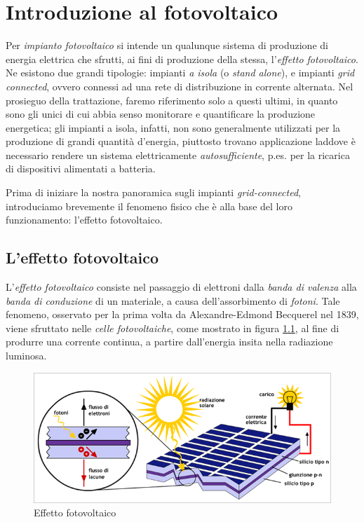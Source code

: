\clearpage{\pagestyle{empty}\cleardoublepage}
\chapter{Introduzione al fotovoltaico}
%
Per \emph{impianto fotovoltaico} si intende un qualunque 
sistema di produzione di energia elettrica che sfrutti, ai fini 
di produzione della stessa, l'\emph{effetto fotovoltaico}.
%
Ne esistono due grandi tipologie: impianti \emph{a isola} (o \emph{stand alone}), 
e impianti \emph{grid connected}, ovvero connessi ad una rete di distribuzione in 
corrente alternata.
%
Nel prosieguo della trattazione, faremo riferimento solo a questi ultimi, 
in quanto sono gli unici di cui abbia senso monitorare e quantificare la produzione energetica; gli impianti 
a isola, infatti, non sono generalmente utilizzati per la produzione di grandi
quantit\`a d'energia, piuttosto trovano applicazione laddove \`e necessario
rendere un sistema elettricamente \emph{autosufficiente}, p.es. per la 
ricarica di dispositivi alimentati a batteria.
%

%
Prima di iniziare la nostra panoramica sugli impianti \emph{grid-connected}, introduciamo
brevemente il fenomeno fisico che \`e alla base del loro funzionamento:
l'effetto fotovoltaico.
%

%
\section{L'effetto fotovoltaico}
L'\emph{effetto fotovoltaico} consiste nel passaggio di elettroni 
dalla \emph{banda di valenza} alla \emph{banda di conduzione} di 
un materiale, a causa dell'assorbimento di \emph{fotoni}. 
%
Tale fenomeno, osservato per la prima volta da Alexandre-Edmond Becquerel nel 1839,
viene sfruttato nelle \emph{celle fotovoltaiche}, come mostrato in figura \ref{effetto-fv},
al fine di produrre una corrente continua, a partire dall'energia insita 
nella radiazione luminosa.
%
\begin{figure}[!h]
\centering
\includegraphics[width=350pt]{img/effetto-fovoltaico.png}
\caption{Effetto fotovoltaico}
\label{effetto-fv}
\end{figure}
%

